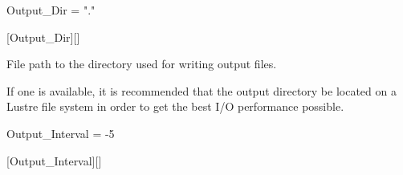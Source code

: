 
\begin{nmldescitem}
Output_Dir = "."
\end{nmldescitem}
[Output\_Dir][]

\begin{nmldescbody}
File path to the directory used for writing output files.

\NOTE
If one is available, it is recommended that the output directory be
located on a Lustre file system in order to get the best I\slash O
performance possible.
\end{nmldescbody}


\begin{nmldescitem}
Output_Interval = -5
\end{nmldescitem}
[Output\_Interval][]

